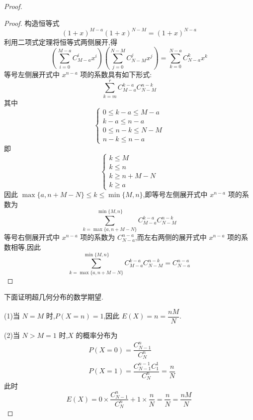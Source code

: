 \begin{proof}
    \begin{proof}
        构造恒等式
        $$
        (1+x)^{M-a} (1+x)^{N-M} = (1+x)^{N-a}
        $$
        利用二项式定理将恒等式两侧展开,得
        $$
        \left( \sum_{i=0}^{M-a} C_{M-a}^i x^i \right) \left( \sum_{j=0}^{N-M} C_{N-M}^j x^j \right) = \sum_{k=0}^{N-a} C_{N-a}^k x^k
        $$
        等号左侧展开式中 $x^{n-a}$ 项的系数具有如下形式:
        $$
        \sum_{k=m}^{r} C_{M-a}^{k-a} C_{N-M}^{n-k}
        $$
        其中
        $$
        \begin{cases}
            0 \leqslant k-a \leqslant M-a \\[-5pt]
            k-a \leqslant n-a \\[-5pt]
            0 \leqslant n-k \leqslant N-M \\[-5pt]
            n-k \leqslant n-a
        \end{cases}
        $$
        即
        $$
        \begin{cases}
            k \leqslant M \\[-5pt]
            k \leqslant n \\[-5pt]
            k \geqslant n+M-N \\[-5pt]
            k \geqslant a
        \end{cases}
        $$
        因此 $\max\{ a, n+M-N \} \leqslant k \leqslant \min\{ M,n \}$,即等号左侧展开式中 $x^{n-a}$ 项的系数为
        $$
        \sum_{k=\max\{ a, n+M-N \}}^{\min\{ M,n \}} C_{M-a}^{k-a} C_{N-M}^{n-k}
        $$
        等号右侧展开式中 $x^{n-a}$ 项的系数为 $C_{N-a}^{n-a}$,而左右两侧的展开式中 $x^{n-a}$ 项的系数相等,因此
        $$
        \sum_{k=\max\{ a, n+M-N \}}^{\min\{ M,n \}} C_{M-a}^{k-a} C_{N-M}^{n-k} = C_{N-a}^{n-a}
        $$

        \vspace{-2em}
    \end{proof}

    下面证明超几何分布的数学期望.

    (1)当 $N=M$ 时,$P(X=n)=1$,因此 $E(X) = n = \dfrac{nM}{N}$.

    (2)当 $N>M=1$ 时,$X$ 的概率分布为
    $$
    \begin{aligned}
        & P(X=0) = \dfrac{C_{N-1}^n}{C_N^n} \\
        & P(X=1) = \dfrac{C_{N-1}^{n-1} C_1^1}{C_N^n} = \dfrac{n}{N}
    \end{aligned}
    $$
    此时
    $$
    E(X) = 0 \times \dfrac{C_{N-1}^n}{C_N^n} + 1 \times \dfrac{n}{N} = \dfrac{n}{N} = \dfrac{nM}{N}
    $$


\end{proof}
